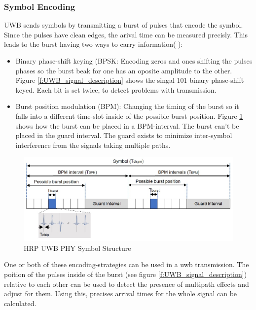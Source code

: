 \subsubsection{Symbol Encoding}
UWB sends symbols by transmitting a burst of pulses that encode the symbol.
Since the pulses have clean edges, the arival time can be measured precisly.
This leads to the burst having two ways to carry information( \cite{QorvoGettingBacktoBasics}):
\begin{itemize}
  \item Binary phase-shift keying (BPSK: Encoding zeros and ones shifting the pulses phases so the burst beak for one has an oposite amplitude to the other. 
Figure \ref{f:UWB_signal_description} shows the singal 101 binary phase-shift keyed. 
Each bit is set twice, to detect problems with transmission.
  \item Burst position modulation (BPM): Changing the timing of the burst so it falls into a different time-slot inside of the possible burst position.	
Figure \ref{f:symbol structure} shows how the burst can be placed in a BPM-interval. 
The burst can't be placed in the guard interval. 
The guard exists to minimize inter-symbol interference from the
signals taking multiple paths.
\end{itemize}

\begin{figure}[ht!]
	\centering
	\includegraphics[width=\linewidth]{graphics/HRP_UWB_PHY_symbol_structure.jpg}
	\caption{HRP UWB PHY Symbol Structure \cite{hsu_2021}}
	\label{f:symbol structure}
\end{figure}

One or both of these encoding-strategies can be used in a uwb transmission.
The poition of the pulses inside of the burst (see figure \ref{f:UWB_signal_description})  relative to each other can be used to detect the presence of multipath effects and adjust for them. 
Using this, precises arrival times for the whole signal can be calculated.

